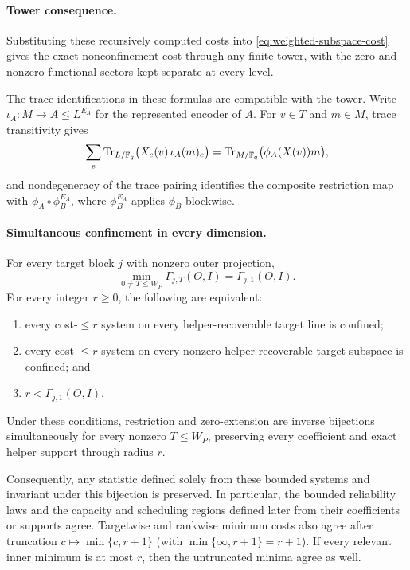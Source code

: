 \paragraph{Tower consequence.}
Substituting these recursively computed costs into
\eqref{eq:weighted-subspace-cost} gives the exact nonconfinement cost through
any finite tower, with the zero and nonzero functional sectors kept separate
at every level.

The trace identifications in these formulas are compatible with the tower.
Write $\iota_A:M\to A\leq L^{E_A}$ for the represented encoder of $A$.
For $v\in T$ and $m\in M$, trace transitivity gives
\[
 \sum_e\operatorname{Tr}_{L/\mathbb F_q}\bigl(X_e(v)\,\iota_A(m)_e\bigr)
 =\operatorname{Tr}_{M/\mathbb F_q}\bigl(\phi_A(X(v))m\bigr),
\]
and nondegeneracy of the trace pairing identifies the composite restriction
map with $\phi_A\circ\phi_B^{E_A}$, where $\phi_B^{E_A}$ applies $\phi_B$
blockwise.

\paragraph{Simultaneous confinement in every dimension.}
\begin{corollary}
\label{cor:all-rank-bottleneck}
%
For every target block $j$ with nonzero outer projection,
\begin{equation}
 \min_{0\ne T\leq W_P}\Gamma_{j,T}(O,I)=\Gamma_{j,1}(O,I).
 \label{eq:all-rank-bottleneck}
\end{equation}
For every integer $r\geq0$, the following are equivalent:
\begin{enumerate}
 \item every cost-$\leq r$ system on every helper-recoverable target line
 is confined;
 \item every cost-$\leq r$ system on every nonzero helper-recoverable
 target subspace is confined; and
 \item $r<\Gamma_{j,1}(O,I)$.
\end{enumerate}
Under these conditions, restriction and zero-extension are inverse bijections
simultaneously for every nonzero $T\leq W_P$, preserving every coefficient and
exact helper support through radius $r$.

Consequently, any statistic defined solely from these bounded systems and
invariant under this bijection is preserved.  In particular, the bounded
reliability laws and the capacity and scheduling regions defined later from
their coefficients or supports agree.  Targetwise and rankwise minimum costs
also agree after truncation $c\mapsto\min\{c,r+1\}$ (with
$\min\{\infty,r+1\}=r+1$).  If every relevant inner minimum is at most $r$,
then the untruncated minima agree as well.
\end{corollary}

